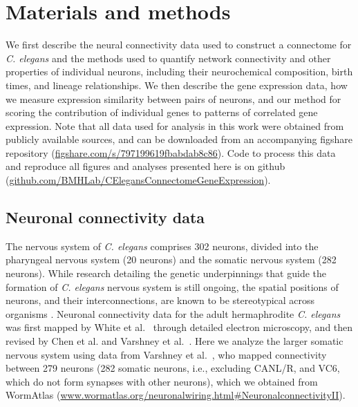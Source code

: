 \documentclass[10pt,letterpaper]{article}
\begin{document}
\section*{Materials and methods}

We first describe the neural connectivity data used to construct a connectome for \textit{C. elegans} and the methods used to quantify network connectivity and other properties of individual neurons, including their neurochemical composition, birth times, and lineage relationships.
We then describe the gene expression data, how we measure expression similarity between pairs of neurons, and our method for scoring the contribution of individual genes to patterns of correlated gene expression.
Note that all data used for analysis in this work were obtained from publicly available sources, and can be downloaded from an accompanying figshare repository (\url{figshare.com/s/797199619fbabdab8c86}).
Code to process this data and reproduce all figures and analyses presented here is on github (\url{github.com/BMHLab/CElegansConnectomeGeneExpression}).

\subsection*{Neuronal connectivity data}
The nervous system of \emph{C. elegans} comprises 302 neurons, divided into the pharyngeal nervous system (20 neurons) and the somatic nervous system (282 neurons).
While research detailing the genetic underpinnings that guide the formation of \textit{C. elegans} nervous system is still ongoing, the spatial positions of neurons, and their interconnections, are known to be stereotypical across organisms \cite{Riddle1997}.
Neuronal connectivity data for the adult hermaphrodite \emph{C. elegans} was first mapped by White et al.~\cite{White:1986tx} through detailed electron microscopy, and then revised by Chen et al. \cite{Chen:2006ie} and Varshney et al.~\cite{Varshney2011}.
Here we analyze the larger somatic nervous system using data from Varshney et al.~\cite{Varshney2011}, who mapped connectivity between 279 neurons (282 somatic neurons, i.e., excluding CANL/R, and VC6, which do not form synapses with other neurons), which we obtained from WormAtlas \cite{WormAtlas} (\url{www.wormatlas.org/neuronalwiring.html#NeuronalconnectivityII}).
\end{document}
